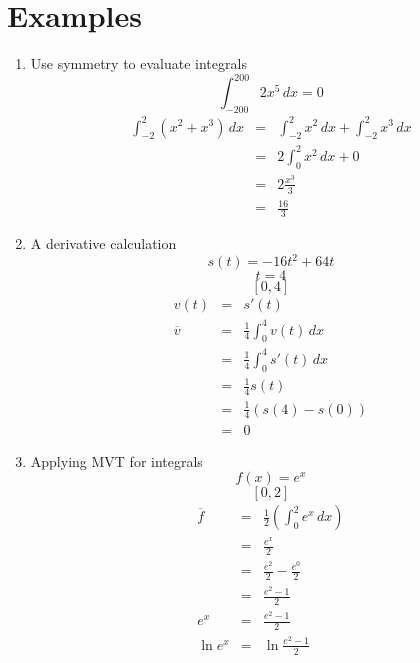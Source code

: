 \documentclass{article}
\begin{document}
\section*{Examples}
\begin{enumerate}
    \item Use symmetry to evaluate integrals
        $$\int_{-200}^{200}{2x^5\,dx} = 0$$
        \begin{eqnarray}
            \int_{-2}^{2}{\left(x^2 + x^3\right)\,dx} &=& \int_{-2}^{2}{x^2\,dx} + \int_{-2}^{2}{x^3\,dx} \\
                                                      &=& 2\int_{0}^{2}{x^2\,dx} + 0 \\
                                                      &=& 2\frac{x^3}{3} \\
                                                      &=& \frac{16}{3}
        \end{eqnarray}
    \item A derivative calculation
        $$s(t) = -16t^2 + 64t$$
        $$t = 4$$
        $$[0,4]$$
        \begin{eqnarray}
            v(t) &=& s'(t) \\
            \overline{v} &=& \frac{1}{4}\int_0^4{v(t)\,dx} \\
                         &=& \frac{1}{4}\int_0^4{s'(t)\,dx} \\
                         &=& \frac{1}{4}s(t) \\
                         &=& \frac{1}{4}\left(s(4) - s(0)\right) \\
                         &=& 0
        \end{eqnarray}
    \item Applying MVT for integrals
        $$f(x) = e^x$$
        $$[0,2]$$
        \begin{eqnarray}
            \overline{f} &=& \frac{1}{2}\left(\int_0^2{e^x\,dx}\right) \\
                         &=& \frac{e^x}{2} \\
                         &=& \frac{e^2}{2} - \frac{e^0}{2} \\
                         &=& \frac{e^2 - 1}{2} \\
            e^x &=& \frac{e^2 - 1}{2} \\
            \ln{e^x} &=& \ln{\frac{e^2 - 1}{2}}
        \end{eqnarray}
\end{enumerate}
\end{document}
